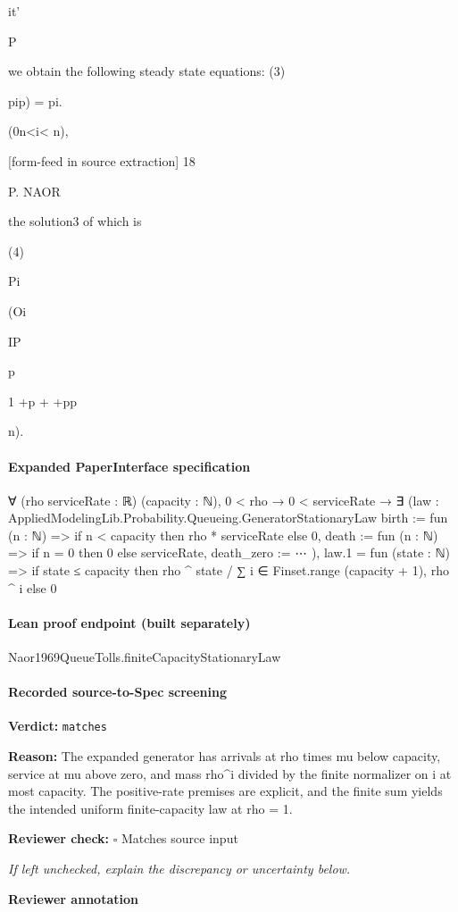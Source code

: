 \documentclass[10pt]{article}
\newcommand{\reviewerbox}{%
  \par\noindent\fbox{\parbox{0.96\linewidth}{\rule{0pt}{0.38in}}}\par
}
\newcommand{\reviewmatch}[1]{%
  \par\noindent\textbf{Reviewer check:} $\square$\; #1\par
  \noindent\emph{If left unchecked, explain the discrepancy or uncertainty below.}\par
}
\begin{document}
\begin{ReviewVerbatim}
it'

P

we obtain the following steady state equations:
(3)

pip) = pi.

(0n<i< n),


[form-feed in source extraction]
18

P. NAOR

the solution3 of which is

(4)

Pi

(Oi

IP

p

1 +p + +pp

n).
\end{ReviewVerbatim}



\paragraph{Expanded PaperInterface specification}
\begin{ReviewVerbatim}
∀ (rho serviceRate : ℝ) (capacity : ℕ),
  0 < rho →
    0 < serviceRate →
      ∃ (law :
        AppliedModelingLib.Probability.Queueing.GeneratorStationaryLaw
          { birth := fun (n : ℕ) => if n < capacity then rho * serviceRate else 0,
            death := fun (n : ℕ) => if n = 0 then 0 else serviceRate, death_zero := ⋯ }),
        law.1 = fun (state : ℕ) =>
          if state ≤ capacity then rho ^ state / ∑ i ∈ Finset.range (capacity + 1), rho ^ i else 0
\end{ReviewVerbatim}



\paragraph{Lean proof endpoint (built separately)}\begin{ReviewVerbatim}
Naor1969QueueTolls.finiteCapacityStationaryLaw
\end{ReviewVerbatim}

\paragraph{Recorded source-to-Spec screening}
\textbf{Verdict:} \texttt{matches}
\\
{\raggedright
\textbf{Reason:} The expanded generator has arrivals at rho times mu below capacity, service at mu above zero, and mass rho\textasciicircum{}i divided by the finite normalizer on i at most capacity.\allowbreak{} The positive-\allowbreak{}rate premises are explicit, and the finite sum yields the intended uniform finite-\allowbreak{}capacity law at rho = 1.\allowbreak{}
\par}
\reviewmatch{Matches source input}
\noindent\textbf{Reviewer annotation}\par
\reviewerbox
\clearpage
\hypertarget{source-claim-f64d5cde090d0927}{}
\end{document}
